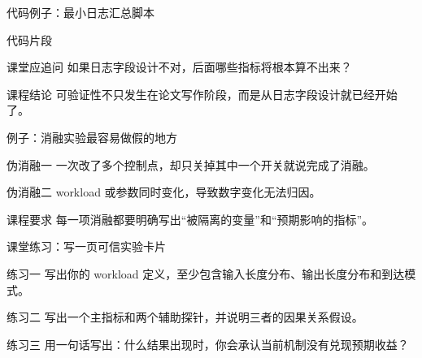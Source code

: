 \begin{frame}{代码例子：最小日志汇总脚本}
  \begin{block}{代码片段}
    {\ttfamily\small
    \par
    \par
    \par
    }
  \end{block}
  \pause
  \begin{block}{课堂应追问}
    如果日志字段设计不对，后面哪些指标将根本算不出来？
  \end{block}
  \pause
  \begin{block}{课程结论}
    可验证性不只发生在论文写作阶段，而是从日志字段设计就已经开始了。
  \end{block}
\end{frame}

\begin{frame}{例子：消融实验最容易做假的地方}
  \begin{block}{伪消融一}
    一次改了多个控制点，却只关掉其中一个开关就说完成了消融。
  \end{block}
  \pause
  \begin{block}{伪消融二}
    workload 或参数同时变化，导致数字变化无法归因。
  \end{block}
  \pause
  \begin{block}{课程要求}
    每一项消融都要明确写出“被隔离的变量”和“预期影响的指标”。
  \end{block}
\end{frame}

\begin{frame}{课堂练习：写一页可信实验卡片}
  \begin{block}{练习一}
    写出你的 workload 定义，至少包含输入长度分布、输出长度分布和到达模式。
  \end{block}
  \pause
  \begin{block}{练习二}
    写出一个主指标和两个辅助探针，并说明三者的因果关系假设。
  \end{block}
  \pause
  \begin{block}{练习三}
    用一句话写出：什么结果出现时，你会承认当前机制没有兑现预期收益？
  \end{block}
\end{frame}
